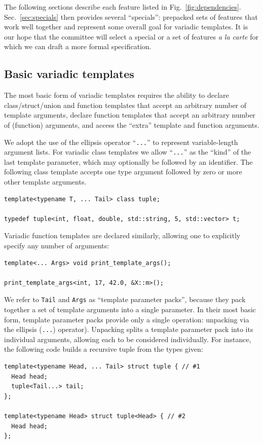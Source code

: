 \documentclass{article}
\begin{document}
The following sections describe each feature listed in
Fig.~\ref{fig:dependencies}. Sec.~\ref{sec:specials} then provides several
``specials'': prepacked sets of features that work well together and
represent some overall goal for variadic templates. It is our hope
that the committee will select a special or a set of features
\textit{a la carte} for which we can draft a more formal
specification. 

\subsection{Basic variadic templates}
\label{sec:basic}
The most basic form of variadic templates requires the ability to
declare class/struct/union and function templates that accept an
arbitrary number of template arguments, declare function templates
that accept an arbitrary number of (function) arguments, and access
the ``extra'' template and function arguments.

We adopt the use of the ellipsis operator ``\texttt{...}'' to
represent variable-length argument lists. For variadic class templates
we allow ``\texttt{...}'' as the ``kind'' of the last template
parameter, which may optionally be followed by an identifier. The
following class template accepts one type argument followed by zero or
more other template arguments.

\begin{verbatim}
template<typename T, ... Tail> class tuple;

typedef tuple<int, float, double, std::string, 5, std::vector> t;
\end{verbatim}

Variadic function templates are declared similarly, allowing one to
explicitly specify any number of arguments:
\begin{verbatim}
template<... Args> void print_template_args();

print_template_args<int, 17, 42.0, &X::m>();
\end{verbatim}

We refer to \texttt{Tail} and \texttt{Args} as ``template parameter
packs'', because they pack together a set of template arguments into a
single parameter. In their most basic form, template parameter packs
provide only a single operation: unpacking via the ellipsis
(\texttt{...}) operator). Unpacking splits a template parameter pack
into its individual arguments, allowing each to be considered
individually. For instance, the following code builds a recursive
tuple from the types given:
\begin{verbatim}
template<typename Head, ... Tail> struct tuple { // #1
  Head head;
  tuple<Tail...> tail;
};

template<typename Head> struct tuple<Head> { // #2
  Head head;
};
\end{verbatim}
\end{document}
